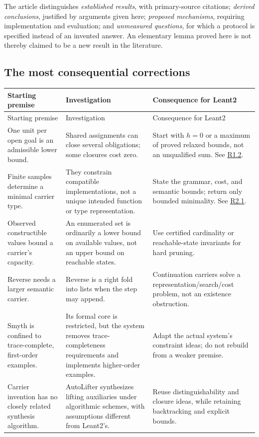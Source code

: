 \documentclass[11pt,a4paper]{article}
\newcommand{\qref}[1]{\hyperref[q:#1]{#1}}
\theoremstyle{definition}
\theoremstyle{remark}
\begin{document}
The article distinguishes \emph{established results}, with primary-source citations; \emph{derived conclusions}, justified by arguments given here; \emph{proposed mechanisms}, requiring implementation and evaluation; and \emph{unmeasured questions}, for which a protocol is specified instead of an invented answer. An elementary lemma proved here is not thereby claimed to be a new result in the literature.

\subsection{The most consequential corrections}

\begin{longtable}{@{}P{36mm}P{55mm}P{58mm}@{}}
\toprule
Starting premise & Investigation & Consequence for Leant2\\
\midrule
\endfirsthead
\toprule Starting premise & Investigation & Consequence for Leant2\\\midrule
\endhead
One unit per open goal is an admissible lower bound. & Shared assignments can close several obligations; some closures cost zero. & Start with $h=0$ or a maximum of proved relaxed bounds, not an unqualified sum. See \qref{R1.2}.\\[4pt]
Finite samples determine a minimal carrier type. & They constrain compatible implementations, not a unique intended function or type representation. & State the grammar, cost, and semantic bounds; return only bounded minimality. See \qref{R2.1}.\\[4pt]
Observed constructible values bound a carrier's capacity. & An enumerated set is ordinarily a lower bound on available values, not an upper bound on reachable states. & Use certified cardinality or reachable-state invariants for hard pruning.\\[4pt]
Reverse needs a larger semantic carrier. & Reverse is a right fold into lists when the step may append. & Continuation carriers solve a representation/search/cost problem, not an existence obstruction.\\[4pt]
Smyth is confined to trace-complete, first-order examples. & Its formal core is restricted, but the system removes trace-completeness requirements and implements higher-order examples.\cite{smyth} & Adapt the actual system's constraint ideas; do not rebuild from a weaker premise.\\[4pt]
Carrier invention has no closely related synthesis algorithm. & AutoLifter synthesizes lifting auxiliaries under algorithmic schemes, with assumptions different from Leant2's.\cite{autolifter} & Reuse distinguishability and closure ideas, while retaining backtracking and explicit bounds.\\[4pt]

\end{longtable}
\end{document}
